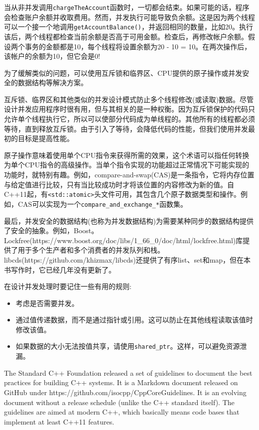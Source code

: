当从非并发调用\texttt{chargeTheAccount}函数时，一切都会结束。如果可能的话，程序会检查账户余额并收取费用。然而，并发执行可能导致负余额。这是因为两个线程可以一个接一个地调用\texttt{getAccountBalance()}，并返回相同的数量，比如20。执行该后，两个线程都检查当前余额是否高于可用金额。检查后，再修改帐户余额。假设两个事务的金额都是10，每个线程将设置余额为20 - 10 = 10。在两次操作后，该帐户的余额为10，但它会是0!

为了缓解类似的问题，可以使用互斥锁和临界区、CPU提供的原子操作或并发安全的数据结构等解决方案。

互斥锁、临界区和其他类似的并发设计模式防止多个线程修改(或读取)数据。尽管设计并发应用程序时很有用，但与其相关的是一种权衡。因为互斥锁保护的代码只允许单个线程执行它，所以可以使部分代码成为单线程的。其他所有的线程都必须等待，直到释放互斥锁。由于引入了等待，会降低代码的性能，但我们使用并发最初的目标是提高性能。

原子操作意味着使用单个CPU指令来获得所需的效果，这个术语可以指任何转换为单个CPU指令的高级操作。当单个指令实现的功能超过正常情况下可能实现的功能时，就特别有趣。例如，compare-and-swap(CAS)是一条指令，它将内存位置与给定值进行比较，只有当比较成功时才将该位置的内容修改为新的值。自C++11起，有\texttt{<std::atomic>}头文件可用，其包含几个原子数据类型和操作。例如，CAS可以实现为一个\texttt{compare\_and\_exchange\_*}函数集。

最后，并发安全的数据结构(也称为并发数据结构)为需要某种同步的数据结构提供了安全的抽象。例如，Boost。Lockfree(https://www.boost.org/doc/libs/1\_66\_0/doc/html/lockfree.html)库提供了用于多个生产者和多个消费者的并发队列和栈。 libcds(https://github.com/khizmax/libcds)还提供了有序list、set和map，但在本书写作时，它已经几年没有更新了。

在设计并发处理时要记住一些有用的规则:

\begin{itemize}
\item 
考虑是否需要并发。

\item 
通过值传递数据，而不是通过指针或引用。这可以防止在其他线程读取该值时修改该值。

\item 
如果数据的大小无法按值共享，请使用\texttt{shared\_ptr}。这样，可以避免资源泄漏。
\end{itemize}


The Standard C++ Foundation released a set of guidelines to document the best practices for building C++ systems. It is a Markdown document released on GitHub under https://github.com/isocpp/CppCoreGuidelines. It is an evolving document without a release schedule (unlike the C++ standard itself). The guidelines are aimed at modern C++, which basically means code bases that implement at least C++11 features.


